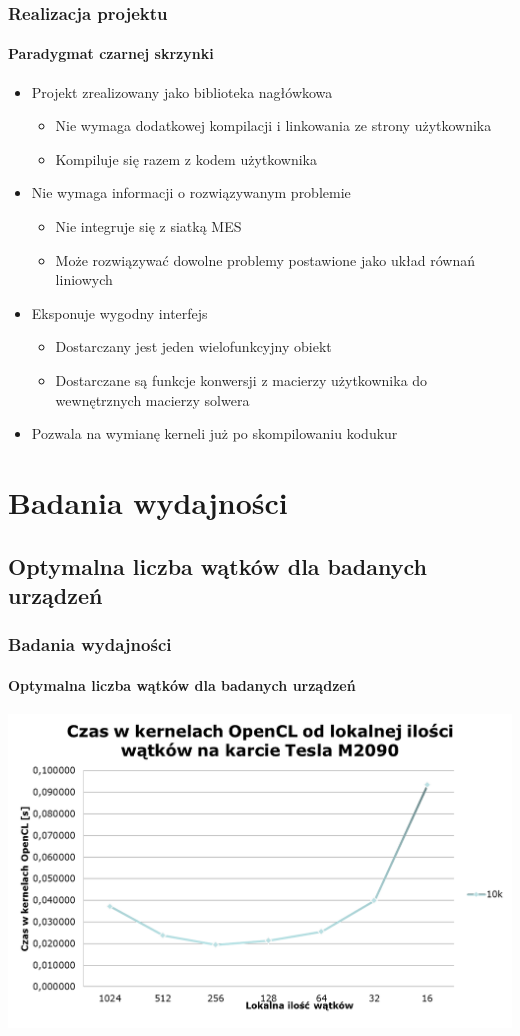 \documentclass[12pt,handout]{beamer}
\begin{document}
\begin{frame}
\frametitle{Realizacja projektu}
\framesubtitle{Paradygmat czarnej skrzynki}

\begin{itemize}[<+->]
	\item Projekt zrealizowany jako biblioteka nagłówkowa
	\begin{itemize}
		\item Nie wymaga dodatkowej kompilacji i linkowania ze strony użytkownika
		\item Kompiluje się razem z kodem użytkownika
	\end{itemize}
	\item Nie wymaga informacji o rozwiązywanym problemie
	\begin{itemize}
		\item Nie integruje się z siatką MES
		\item Może rozwiązywać dowolne problemy postawione jako układ równań liniowych
	\end{itemize}
	\item Eksponuje wygodny interfejs
		\begin{itemize}
		\item Dostarczany jest jeden wielofunkcyjny obiekt
		\item Dostarczane są funkcje konwersji z macierzy użytkownika do wewnętrznych macierzy solwera
		\end{itemize}
	\item Pozwala na wymianę kerneli już po skompilowaniu kodukur
\end{itemize}

\end{frame}

\section{Badania wydajności}

\subsection{Optymalna liczba wątków dla badanych urządzeń}

\begin{frame}
\frametitle{Badania wydajności}
\framesubtitle{Optymalna liczba wątków dla badanych urządzeń}
\hfill\includegraphics[scale=0.45]{czas1.png}\hspace*{\fill}
\end{frame}
\end{document}
